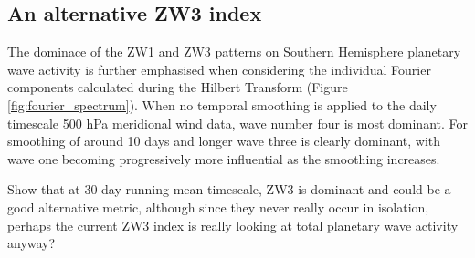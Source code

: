 \subsection{An alternative ZW3 index}

The dominace of the ZW1 and ZW3 patterns on Southern Hemisphere planetary wave activity is further emphasised when considering the individual Fourier components calculated during the Hilbert Transform (Figure \ref{fig:fourier_spectrum}). When no temporal smoothing is applied to the daily timescale 500 hPa meridional wind data, wave number four is most dominant. For smoothing of around 10 days and longer wave three is clearly dominant, with wave one becoming progressively more influential as the smoothing increases.




Show that at 30 day running mean timescale, ZW3 is dominant and could be a good alternative metric, although since they never really occur in isolation, perhaps the current ZW3 index is really looking at total planetary wave activity anyway?
